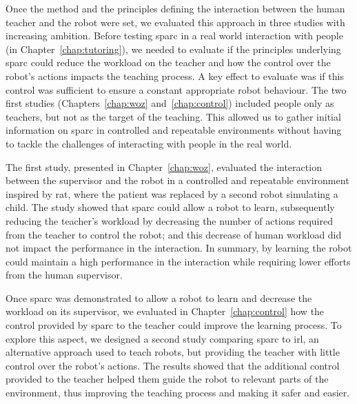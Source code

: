 Once the method and the principles defining the interaction between the human teacher and the robot were set, we evaluated this approach in three studies with increasing ambition. Before testing \gls{sparc} in a real world interaction with people (in Chapter~\ref{chap:tutoring}), we needed to evaluate if the principles underlying \gls{sparc} could reduce the workload on the teacher and how the control over the robot's actions impacts the teaching process. A key effect to evaluate was if this control was sufficient to ensure a constant appropriate robot behaviour. The two first studies (Chapters~\ref{chap:woz} and~\ref{chap:control}) included people only as teachers, but not as the target of the teaching. This allowed us to gather initial information on \gls{sparc} in controlled and repeatable environments without having to tackle the challenges of interacting with people in the real world.

The first study, presented in Chapter~\ref{chap:woz}, evaluated the interaction between the supervisor and the robot in a controlled and repeatable environment inspired by \gls{rat}, where the patient was replaced by a second robot simulating a child. The study showed that \gls{sparc} could allow a robot to learn, subsequently reducing the teacher's workload by decreasing the number of actions required from the teacher to control the robot; and this decrease of human workload did not impact the performance in the interaction. In summary, by learning the robot could maintain a high performance in the interaction while requiring lower efforts from the human supervisor.

Once \gls{sparc} was demonstrated to allow a robot to learn and decrease the workload on its supervisor, we evaluated in Chapter~\ref{chap:control} how the control provided by \gls{sparc} to the teacher could improve the learning process. To explore this aspect, we designed a second study comparing \gls{sparc} to \gls{irl}, an alternative approach used to teach robots, but providing the teacher with little control over the robot's actions. The results showed that the additional control provided to the teacher helped them guide the robot to relevant parts of the environment, thus improving the teaching process and making it safer and easier.

